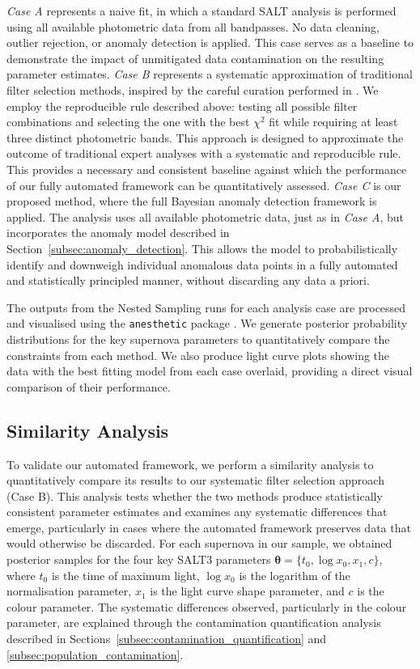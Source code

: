 \textit{Case A} represents a naive fit, in which a standard SALT analysis is performed using all available photometric data from all bandpasses. No data cleaning, outlier rejection, or anomaly detection is applied. This case serves as a baseline to demonstrate the impact of unmitigated data contamination on the resulting parameter estimates. \textit{Case B} represents a systematic approximation of traditional filter selection methods, inspired by the careful curation performed in \citet{do2025hawaii}. We employ the reproducible rule described above: testing all possible filter combinations and selecting the one with the best $\chi^2$ fit while requiring at least three distinct photometric bands. This approach is designed to approximate the outcome of traditional expert analyses with a systematic and reproducible rule. This provides a necessary and consistent baseline against which the performance of our fully automated framework can be quantitatively assessed. \textit{Case C} is our proposed method, where the full Bayesian anomaly detection framework is applied. The analysis uses all available photometric data, just as in \textit{Case A}, but incorporates the anomaly model described in Section~\ref{subsec:anomaly_detection}. This allows the model to probabilistically identify and downweigh individual anomalous data points in a fully automated and statistically principled manner, without discarding any data a priori.

The outputs from the Nested Sampling runs for each analysis case are processed and visualised using the \texttt{anesthetic} package \citep{Handley2019}. We generate posterior probability distributions for the key supernova parameters to quantitatively compare the constraints from each method. We also produce light curve plots showing the data with the best fitting model from each case overlaid, providing a direct visual comparison of their performance.

\subsection{Similarity Analysis}

To validate our automated framework, we perform a similarity analysis to quantitatively compare its results to our systematic filter selection approach (Case B). This analysis tests whether the two methods produce statistically consistent parameter estimates and examines any systematic differences that emerge, particularly in cases where the automated framework preserves data that would otherwise be discarded. For each supernova in our sample, we obtained posterior samples for the four key SALT3 parameters $\boldsymbol{\theta} = \{t_0, \log x_0, x_1, c\}$, where $t_0$ is the time of maximum light, $\log x_0$ is the logarithm of the normalisation parameter, $x_1$ is the light curve shape parameter, and $c$ is the colour parameter. The systematic differences observed, particularly in the colour parameter, are explained through the contamination quantification analysis described in Sections~\ref{subsec:contamination_quantification} and \ref{subsec:population_contamination}.

